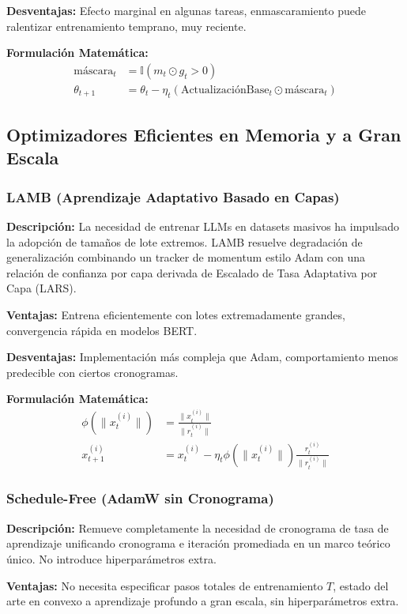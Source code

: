 \documentclass[11pt,a4paper]{article}
\begin{document}
\textbf{Desventajas:} Efecto marginal en algunas tareas, enmascaramiento puede ralentizar entrenamiento temprano, muy reciente.

\textbf{Formulación Matemática:}
\begin{align}
\text{máscara}_t &= \mathbb{I}(m_t \odot g_t > 0) \\
\theta_{t+1} &= \theta_t - \eta_t (\text{ActualizaciónBase}_t \odot \text{máscara}_t)
\end{align}

\subsection{Optimizadores Eficientes en Memoria y a Gran Escala}

\subsubsection{LAMB (Aprendizaje Adaptativo Basado en Capas)}

\textbf{Descripción:} La necesidad de entrenar LLMs en datasets masivos ha impulsado la adopción de tamaños de lote extremos. LAMB resuelve degradación de generalización combinando un tracker de momentum estilo Adam con una relación de confianza por capa derivada de Escalado de Tasa Adaptativa por Capa (LARS).

\textbf{Ventajas:} Entrena eficientemente con lotes extremadamente grandes, convergencia rápida en modelos BERT.

\textbf{Desventajas:} Implementación más compleja que Adam, comportamiento menos predecible con ciertos cronogramas.

\textbf{Formulación Matemática:}
\begin{align}
\phi(\|x^{(i)}_t\|) &= \frac{\|x^{(i)}_t\|}{\|r^{(i)}_t\|} \\
x^{(i)}_{t+1} &= x^{(i)}_t - \eta_t \phi(\|x^{(i)}_t\|) \frac{r^{(i)}_t}{\|r^{(i)}_t\|}
\end{align}

\subsubsection{Schedule-Free (AdamW sin Cronograma)}

\textbf{Descripción:} Remueve completamente la necesidad de cronograma de tasa de aprendizaje unificando cronograma e iteración promediada en un marco teórico único. No introduce hiperparámetros extra.

\textbf{Ventajas:} No necesita especificar pasos totales de entrenamiento $T$, estado del arte en convexo a aprendizaje profundo a gran escala, sin hiperparámetros extra.
\end{document}
